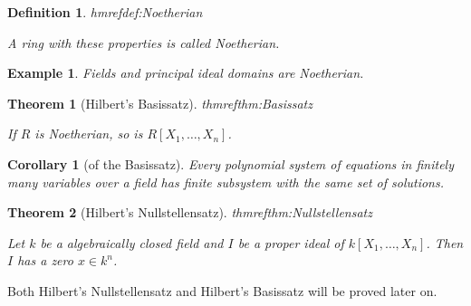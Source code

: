 \documentclass[DIV=14,parskip=full,pointednumbers]{scrartcl}
\theoremstyle{cthm}
\newtheorem{thm}{Theorem}[subsection]
\newtheorem{cor}{Corollary}[subsection]
\theoremstyle{cdef}
\newtheorem{defi}{Definition}[subsection]
\newtheorem{example}{Example}[subsection]
\newcommand{\lbl}[1]{
	\label{#1}
	\edef\dummy{\curthm}
	\expandafter\xdef\csname thmref#1\endcsname{\dummy}
}
\begin{document}
\begin{defi}\lbl{def:Noetherian}
 A ring with these properties is called \emph{Noetherian}.
\end{defi}
\begin{example}
 Fields and principal ideal domains are Noetherian. 
\end{example}
\begin{thm}[Hilbert's Basissatz]\lbl{thm:Basissatz}
 If $R$ is Noetherian, so is $R[X_1,\ldots,X_n]$.
\end{thm}
\begin{cor}[of the Basissatz]
 Every polynomial system of equations in finitely many variables over a field has finite subsystem with the same set of solutions.
\end{cor}
\begin{thm}[Hilbert's Nullstellensatz] \lbl{thm:Nullstellensatz}
 Let $k$ be a algebraically closed field and $I$ be a proper ideal of $k[X_1,\ldots,X_n]$. Then $I$ has a zero $x\in k^n$.
\end{thm}
Both Hilbert's Nullstellensatz and Hilbert's Basissatz will be proved later on.
\end{document}
